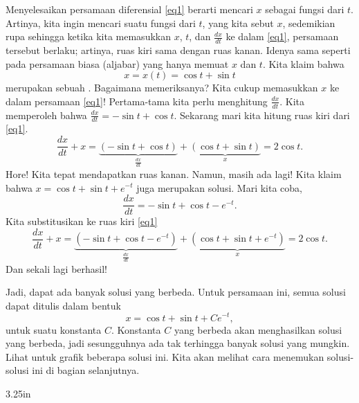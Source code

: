 Menyelesaikan persamaan diferensial \eqref{eq1} berarti mencari $x$ sebagai fungsi dari $t$. Artinya, kita ingin mencari suatu fungsi dari $t$, yang kita sebut $x$, sedemikian rupa sehingga ketika kita memasukkan $x$, $t$, dan $\frac{dx}{dt}$ ke dalam \eqref{eq1}, persamaan tersebut berlaku;
artinya, ruas kiri sama dengan ruas kanan.
Idenya sama seperti pada persamaan biasa (aljabar) yang hanya memuat
$x$ dan $t$. Kita klaim bahwa
\begin{equation*}
x = x(t) = \cos t + \sin t
\end{equation*}
merupakan sebuah \emph{}.
Bagaimana memeriksanya? Kita cukup memasukkan $x$ ke dalam persamaan \eqref{eq1}! Pertama-tama kita
perlu menghitung $\frac{dx}{dt}$. Kita memperoleh bahwa $\frac{dx}{dt} =
-\sin t + \cos t$. Sekarang mari kita hitung ruas kiri
dari \eqref{eq1}.
\begin{equation*}
\frac{dx}{dt} + x =
\underbrace{(-\sin t + \cos t)}_{\frac{dx}{dt}}
+
\underbrace{(\cos t + \sin t)}_{x}
=
2\cos t .
\end{equation*}
Hore! Kita tepat mendapatkan ruas kanan.
Namun, masih ada lagi!
Kita klaim bahwa
$x = \cos t + \sin t + e^{-t}$ juga merupakan
solusi. Mari kita coba,
\begin{equation*}
\frac{dx}{dt} = -\sin t + \cos t - e^{-t} .
\end{equation*}
Kita substitusikan ke ruas kiri \eqref{eq1}
\begin{equation*}
\frac{dx}{dt} + x =
\underbrace{(-\sin t + \cos t - e^{-t})}_{\frac{dx}{dt}} +
\underbrace{(\cos t + \sin t + e^{-t})}_{x}
= 2\cos t .
\end{equation*}
Dan sekali lagi berhasil!

Jadi, dapat ada banyak solusi yang berbeda. Untuk persamaan ini, semua
solusi dapat ditulis dalam bentuk
\begin{equation*}
x = \cos t + \sin t + C e^{-t} ,
\end{equation*}
untuk suatu konstanta $C$. Konstanta $C$ yang berbeda akan menghasilkan solusi
yang berbeda, jadi sesungguhnya ada tak terhingga banyak solusi yang mungkin.
Lihat  untuk grafik beberapa solusi ini.
Kita akan melihat cara menemukan solusi-solusi ini
di bagian selanjutnya.

\medskip

\begin{mywrapfig}{3.25in}
\capstart
{}
\caption{Beberapa solusi dari $\frac{dx}{dt} + x = 2 \cos t$.\label{intro:plotsfig}}
\end{mywrapfig}%


